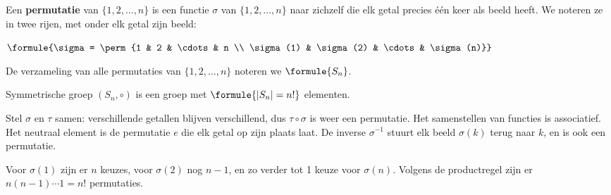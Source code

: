 \begin{theorie}
Een \textbf{\textcolor{accent}{permutatie}} van $\{1, 2, \ldots, n\}$ is een functie $\sigma$ van $\{1, 2, \ldots, n\}$ naar zichzelf die elk getal precies één keer als beeld heeft. We noteren ze in twee rijen, met onder elk getal zijn beeld:

\vspace{1mm}
\qquad $\formule{\sigma = \perm{1 & 2 & \cdots & n \\ \sigma(1) & \sigma(2) & \cdots & \sigma(n)}}$

\vspace{1mm}
De verzameling van alle permutaties van $\{1, 2, \ldots, n\}$ noteren we $\formule{S_n}$.

\begin{stelling}{Symmetrische groep}
$(S_n, \circ)$ is een groep met \quad $\formule{|S_n| = n!}$ \quad elementen.
\end{stelling}

\begin{bewijs}
Stel $\sigma$ en $\tau$ samen: verschillende getallen blijven verschillend, dus $\tau \circ \sigma$ is weer een permutatie. Het samenstellen van functies is associatief. Het neutraal element is de permutatie $e$ die elk getal op zijn plaats laat. De inverse $\sigma^{-1}$ stuurt elk beeld $\sigma(k)$ terug naar $k$, en is ook een permutatie.

Voor $\sigma(1)$ zijn er $n$ keuzes, voor $\sigma(2)$ nog $n - 1$, en zo verder tot 1 keuze voor $\sigma(n)$. Volgens de productregel zijn er $n(n - 1) \cdots 1 = n!$ permutaties.
\end{bewijs}
\end{theorie}


